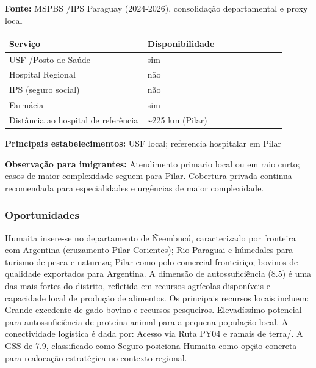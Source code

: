 \textbf{Fonte:} MSPBS /\allowbreak  IPS Paraguay (2024-2026), consolidação
departamental e proxy local

{\def\LTcaptype{none} %
\begin{longtable}{@{}>{\raggedright\arraybackslash}p{0.45\linewidth} >{\raggedright\arraybackslash}p{0.45\linewidth}@{}}
\toprule\noalign{}
Serviço & Disponibilidade \\
\midrule\noalign{}
\endhead
\bottomrule\noalign{}
\endlastfoot
USF /\allowbreak  Posto de Saúde & sim \\
Hospital Regional & não \\
IPS (seguro social) & não \\
Farmácia & sim \\
Distância ao hospital de referência & \textasciitilde225 km (Pilar) \\
\end{longtable}
}

\textbf{Principais estabelecimentos:} USF local; referencia hospitalar
em Pilar

\textbf{Observação para imigrantes:} Atendimento primario local ou em
raio curto; casos de maior complexidade seguem para Pilar. Cobertura
privada continua recomendada para especialidades e urgências de maior
complexidade.
\newpage

\subsubsection*{Oportunidades}\label{oport-humaita-1207}
Humaita insere-se no departamento de Ñeembucú, caracterizado por fronteira com Argentina (cruzamento Pilar-Corientes); Rio Paraguai e húmedales para turismo de pesca e natureza; Pilar como polo comercial fronteiriço; bovinos de qualidade exportados para Argentina. A dimensão de autossuficiência (8.5) é uma das mais fortes do distrito, refletida em recursos agrícolas disponíveis e capacidade local de produção de alimentos. Os principais recursos locais incluem: Grande excedente de gado bovino e recursos pesqueiros. Elevadíssimo potencial para autossuficiência de proteína animal para a pequena população local. A conectividade logística é dada por: Acesso via Ruta PY04 e ramais de terra/. A GSS de 7.9, classificado como Seguro posiciona Humaita como opção concreta para realocação estratégica no contexto regional.

